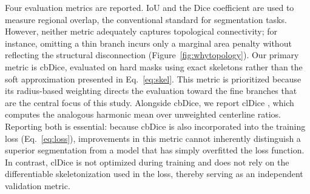\documentclass[11pt,a4paper]{article}
\begin{document}
Four evaluation metrics are reported. IoU and the Dice coefficient are used
to measure regional overlap, the conventional standard for segmentation
tasks. However, neither metric adequately captures topological connectivity;
for instance, omitting a thin branch incurs only a marginal area penalty
without reflecting the structural disconnection
(Figure~\ref{fig:whytopology}). Our primary metric is cbDice, evaluated on
hard masks using exact skeletons rather than the soft approximation presented
in Eq.~\ref{eq:skel}. This metric is prioritized because its radius-based
weighting directs the evaluation toward the fine branches that are the
central focus of this study. Alongside cbDice, we report clDice
\cite{shit2021cldice}, which computes the analogous harmonic mean over
unweighted centerline ratios. Reporting both is essential: because cbDice is
also incorporated into the training loss (Eq.~\ref{eq:loss}), improvements in
this metric cannot inherently distinguish a superior segmentation from a
model that has simply overfitted the loss function. In contrast, clDice is
not optimized during training and does not rely on the differentiable
skeletonization used in the loss, thereby serving as an independent validation metric.
\end{document}
